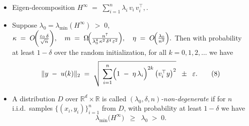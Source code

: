 \documentclass[serif, aspectratio=169]{beamer}
\begin{document}
\begin{frame}
	\begin{itemize}
		
		\item Eigen-decomposition $H^\infty\;=\; \sum_{i=1}^n \lambda_i\,v_i\,v_i^\top,$.
		
		
		\item Suppose $\lambda_0 = \lambda_{\min}(H^\infty) \;>\; 0$, 
		\(
		\kappa \;=\; O\!\biggl(\frac{\varepsilon_0\,\delta}{\sqrt{n}}\biggr),
		\quad
		m \;=\; \Omega\!\Bigl(\frac{n^7}{\lambda_0^4\,\kappa^2\,\delta^4\,\varepsilon^2}\Bigr),
		\quad
		\eta \;=\; O\!\Bigl(\frac{\lambda_0}{n^2}\Bigr).
		\)
		Then with probability at least $1 - \delta$ over the random initialization, 
		for all $k = 0,1,2,\dots$ we have
		\[
		\|y \;-\; u(k)\|_2 
		\;=\;
		\sqrt{\;\sum_{i=1}^n \Bigl(1 \;-\; \eta\,\lambda_i\Bigr)^{2k}\,\bigl(v_i^\top y\bigr)^2}
		\;\;\pm\;\;\varepsilon.
		\tag{8}
		\]
		
		
		
		\item 
		A distribution $D$ over $\mathbb{R}^d \times \mathbb{R}$ is called 
		$(\lambda_0,\delta,n)$\emph{-non-degenerate} 
		if for $n$ i.i.d.\ samples $\{(x_i,y_i)\}_{i=1}^n$ from $D$, 
		with probability at least $1 - \delta$ we have
		\[
		\lambda_{\min}\bigl(H^\infty\bigr) \;\;\ge\;\; \lambda_0 \;>\; 0.
		\]
		
	\end{itemize}
	
\end{frame}


%

\end{document}

